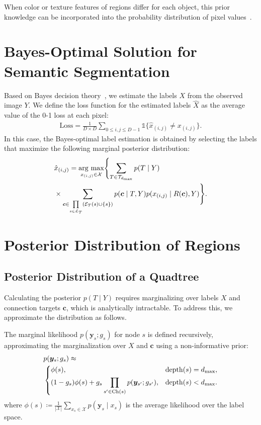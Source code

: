 \documentclass[conference]{IEEEtran}
\newcommand{\argmax}{\mathop{\rm arg~max}}%
\theoremstyle{definition}
\begin{document}
When color or texture features of regions differ for each object, this prior knowledge can be incorporated into the probability distribution of pixel values~\cite{Carson_Blobworld, Oe_2DAR}. 





\section{Bayes-Optimal Solution for Semantic Segmentation}

Based on Bayes decision theory~\cite{berger_bayes_decision_theory}, we estimate the labels $X$ from the observed image $Y$.
We define the loss function for the estimated labels $\hat{X}$ as the average value of the 0-1 loss at each pixel:
\begin{align}
  \text{Loss} = \frac{1}{D \times D} \sum_{0 \leq i, j \leq D-1} \mathds{1} \{\hat{x}_{(i, j)} \neq x_{(i, j)}\}. \label{loss_function}
\end{align}
In this case, the Bayes-optimal label estimation is obtained by selecting the labels that maximize the following marginal posterior distribution:
\begin{align}
  &\hat{x}_{(i,j)} = \argmax_{x_{(i, j)} \in \mathcal{X}} \Biggl\{\sum_{T \in \mathcal{T}_{d_{\text{max}}}}  p(T \mid Y) \nonumber \\
  &\times \sum_{\bm{c} \in \prod\limits_{s \in \mathcal{L}_T} (\mathcal{E}_T(s) \cup \{s\})} p(\bm{c} \mid T, Y) p(x_{(i, j)} \mid R(\bm{c}), Y)\Biggr\}. \label{bayes_optimal_solution}
\end{align}


\section{Posterior Distribution of Regions}

\subsection{Posterior Distribution of a Quadtree}

Calculating the posterior $p(T \mid Y)$ requires marginalizing over labels $X$ and connection targets $\bm{c}$, which is analytically intractable. 
To address this, we approximate the distribution as follows.

The marginal likelihood $p(\bm{y}_{s}; g_s)$ for node $s$ is defined recursively, approximating the marginalization over $X$ and $\bm{c}$ using a non-informative prior:
\begin{align}
  &p(\bm{y}_{s}; g_s) \approx \nonumber \\
  &\begin{dcases}
    \phi(s), & \mathrm{depth}(s) = d_{\mathrm{max}}, \\
    (1-g_{s}) \phi(s) + g_{s} \prod_{s'\in \mathrm{Ch}(s)} p(\bm{y}_{s'}; g_{s'}), & \mathrm{depth}(s) < d_{\mathrm{max}}.
  \end{dcases}
\end{align}
where $\phi(s) \coloneqq \frac{1}{|\mathcal{X}|} \sum_{x_s \in \mathcal{X}} p(\bm{y}_{s} \mid x_{s})$ is the average likelihood over the label space.
\end{document}
